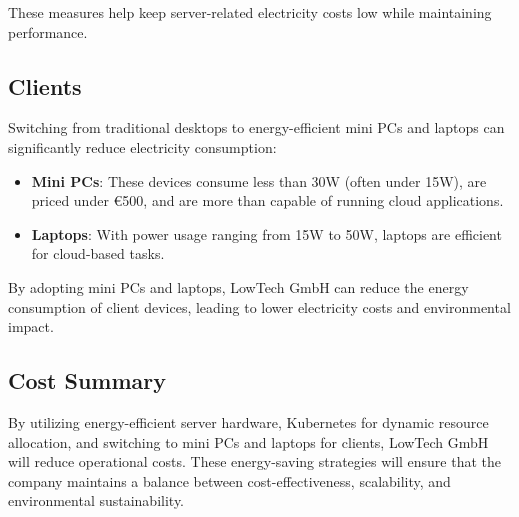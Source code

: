 These measures help keep server-related electricity costs low while maintaining performance.

\subsection{Clients}

Switching from traditional desktops to energy-efficient mini PCs and laptops can significantly reduce electricity consumption:
\begin{itemize}
    \item \textbf{Mini PCs}: These devices consume less than 30W (often under 15W), are priced under €500, and are more than capable of running cloud applications.
    \item \textbf{Laptops}: With power usage ranging from 15W to 50W, laptops are efficient for cloud-based tasks.
\end{itemize}

By adopting mini PCs and laptops, LowTech GmbH can reduce the energy consumption of client devices, leading to lower electricity costs and environmental impact.

\subsection{Cost Summary}

By utilizing energy-efficient server hardware, Kubernetes for dynamic resource allocation, and switching to mini PCs and laptops for clients, LowTech GmbH will reduce operational costs. These energy-saving strategies will ensure that the company maintains a balance between cost-effectiveness, scalability, and environmental sustainability.



